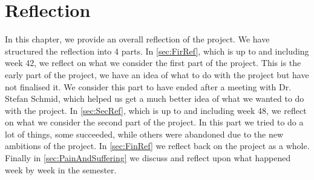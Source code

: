 \chapter{Reflection}\label{cha:weeklyProg}
In this chapter, we provide an overall reflection of the project. We have
structured the reflection into 4 parts. In \autoref{sec:FirRef}, which is up to
and including week 42, we reflect on what we consider the first part of the
project. This is the early part of the project, we have an idea of what to do
with the project but have not finalised it. We consider this part to have ended
after a meeting with Dr. Stefan Schmid, which helped us get a much better idea
of what we wanted to do with the project. In \autoref{sec:SecRef}, which is up
to and including week 48, we reflect on what we consider the second part of the
project. In this part we tried to do a lot of things, some succeeded, while
others were abandoned due to the new ambitions of the project. In
\autoref{sec:FinRef} we reflect back on the project as a whole. Finally in
\autoref{sec:PainAndSuffering} we discuss and reflect upon what happened week
by week in the semester.

\newpage
\newpage
\newpage


